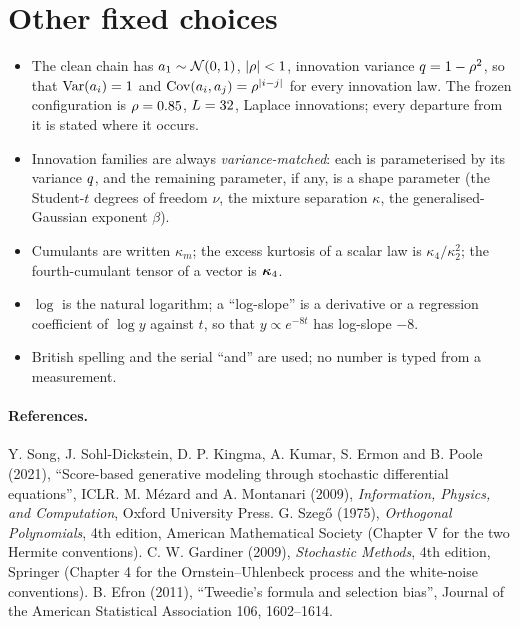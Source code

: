 \section{Other fixed choices}

\begin{itemize}
\item The clean chain has $a_1\sim\mathcal{N}\!\left(0,1\right)$, $|\rho|<1$, innovation variance
  $q=1-\rho^2$, so that $\operatorname{Var}(a_i)=1$ and $\operatorname{Cov}(a_i,a_j)=\rho^{|i-j|}$ for every
  innovation law. The frozen configuration is $\rho=0.85$, $L=32$, Laplace
  innovations; every departure from it is stated where it occurs.
\item Innovation families are always \emph{variance-matched}: each is parameterised
  by its variance $q$, and the remaining parameter, if any, is a shape parameter
  (the Student-$t$ degrees of freedom $\nu$, the mixture separation $\kappa$, the
  generalised-Gaussian exponent $\beta$).
\item Cumulants are written $\kappa_m$; the excess kurtosis of a scalar law is
  $\kappa_4/\kappa_2^2$; the fourth-cumulant tensor of a vector is $\bm{\kappa}_4$.
\item $\log$ is the natural logarithm; a ``log-slope'' is a derivative or a regression
  coefficient of $\log y$ against $t$, so that $y\propto e^{-8t}$ has log-slope $-8$.
\item British spelling and the serial ``and'' are used; no number is typed from a
  measurement.
\end{itemize}


\paragraph{References.}
Y. Song, J. Sohl-Dickstein, D. P. Kingma, A. Kumar, S. Ermon and B. Poole (2021),
``Score-based generative modeling through stochastic differential equations'', ICLR.
M. M\'ezard and A. Montanari (2009), \emph{Information, Physics, and Computation},
Oxford University Press.
G. Szeg\H{o} (1975), \emph{Orthogonal Polynomials}, 4th edition, American Mathematical
Society (Chapter V for the two Hermite conventions).
C. W. Gardiner (2009), \emph{Stochastic Methods}, 4th edition, Springer (Chapter 4 for
the Ornstein--Uhlenbeck process and the white-noise conventions).
B. Efron (2011), ``Tweedie's formula and selection bias'', Journal of the American
Statistical Association 106, 1602--1614.
